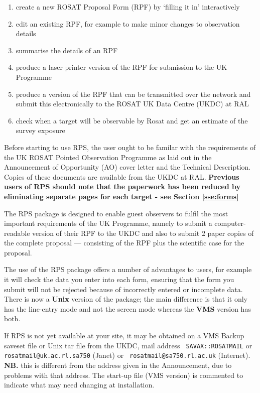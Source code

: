 \begin{enumerate}

\item create a new ROSAT Proposal Form (RPF) by `filling it in'
interactively

\item edit an existing RPF, for example to make minor changes to
observation details

\item summarise the details of an RPF

\item produce a laser printer version of the RPF for submission to the
UK Programme

\item produce a version of the RPF that can be transmitted over the
network and submit this electronically to the ROSAT UK Data Centre
(UKDC) at RAL

\item check when a target will be observable by Rosat and get an
estimate of the survey exposure

\end{enumerate}

Before starting to use RPS, the user ought to be familar with the
requirements of the UK ROSAT Pointed Observation Programme as laid out
in the Announcement of Opportunity (AO) cover letter and the Technical
Description. Copies of these documents are available from the UKDC at
RAL. {\bf Previous users of RPS should note that the paperwork has been
reduced by eliminating separate pages for each target - see Section
\ref{sse:forms}}

The RPS package is designed to enable guest observers to fulfil the
most important requirements of the UK Programme, namely to submit a
computer-readable version of their RPF to the UKDC and also to submit 2
paper copies of the complete proposal --- consisting of the RPF plus
the scientific case for the proposal.

The use of the RPS package offers a number of advantages to users, for
example it will check the data you enter into each form, ensuring that
the form you submit will not be rejected because of incorrectly entered
or incomplete data. There is now a {\bf Unix} version of the package;
the main difference is that it only has the line-entry mode and not the
screen mode whereas the {\bf VMS} version has both.

If RPS is not yet available at your site, it may be obtained on a VMS
Backup saveset file or Unix tar file from the UKDC, mail address {\tt
SAVAX::ROSATMAIL} or {\tt rosatmail@uk.ac.rl.sa750} (Janet) or {\tt
rosatmail@sa750.rl.ac.uk} (Internet).  {\bf NB.} this is different from
the address given in the Announcement, due to problems with that address.
The start-up file (VMS version) is commented
to indicate what may need changing at installation.

